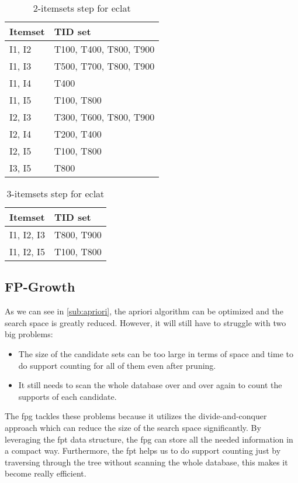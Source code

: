\begin{table}[]
    \centering
    \begin{tabular}{|l|l|}
    \hline
    Itemset & TID set                \\ \hline
    I1, I2  & T100, T400, T800, T900 \\ \hline
    I1, I3  & T500, T700, T800, T900 \\ \hline
    I1, I4  & T400                   \\ \hline
    I1, I5  & T100, T800             \\ \hline
    I2, I3  & T300, T600, T800, T900 \\ \hline
    I2, I4  & T200, T400             \\ \hline
    I2, I5  & T100, T800             \\ \hline
    I3, I5  & T800                   \\ \hline
    \end{tabular}
    \caption{2-itemsets step for \ac{eclat} \citep{han2012mining}}
    \label{tab:2-itemsets-eclat}
\end{table}

\begin{table}[]
    \centering
    \begin{tabular}{|l|l|}
    \hline
    Itemset     & TID set    \\ \hline
    I1, I2, I3  & T800, T900 \\ \hline
    I1, I2, I5  & T100, T800 \\ \hline
    \end{tabular}
    \caption{3-itemsets step for \ac{eclat} \citep{han2012mining}}
    \label{tab:3-itemsets-eclat}
\end{table}

\subsection{FP-Growth}
\label{sub:fp-growth}

As we can see in \autoref{sub:apriori}, the \acl{apriori} algorithm can be optimized and the search space is greatly reduced.
However, it will still have to struggle with two big problems:
\begin{itemize}
    \item The size of the candidate sets can be too large in terms of space and time to do support counting for all of them even after pruning.
    \item It still needs to scan the whole database over and over again to count the supports of each candidate.
\end{itemize}
The \acl{fpg} tackles these problems because it utilizes the divide-and-conquer approach which can reduce the size of the search space significantly.
By leveraging the \acl{fpt} data structure, the \acl{fpg} can store all the needed information in a compact way.
Furthermore, the \acl{fpt} helps us to do support counting just by traversing through the tree without scanning the whole database, this makes it become really efficient.


